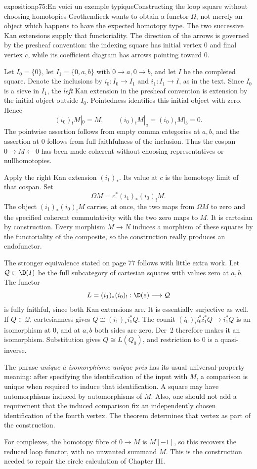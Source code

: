 \begin{dcomment}{exposition}{p75:En voici un exemple typique}{Constructing the loop square without choosing homotopies}
Grothendieck wants to obtain a functor \(\Omega\), not merely an object which happens to have the expected homotopy type. The two successive Kan extensions supply that functoriality. The direction of the arrows is governed by the presheaf convention: the indexing square has initial vertex \(0\) and final vertex \(c\), while its coefficient diagram has arrows pointing toward \(0\).

Let \(I_0=\{0\}\), let \(I_1=\{0,a,b\}\) with \(0\to a,0\to b\), and let \(I\) be the completed square. Denote the inclusions by \(i_0:I_0\to I_1\) and \(i_1:I_1\to I\), as in the text. Since \(I_0\) is a sieve in \(I_1\), the \emph{left} Kan extension in the presheaf convention is extension by the initial object outside \(I_0\). Pointedness identifies this initial object with zero. Hence
\[
 (i_0)_!M|_0=M,\qquad
 (i_0)_!M|_a=(i_0)_!M|_b=0.
\]
The pointwise assertion follows from empty comma categories at \(a,b\), and the assertion at \(0\) follows from full faithfulness of the inclusion. Thus the cospan \(0\to M\leftarrow0\) has been made coherent without choosing representatives or nullhomotopies.

Apply the right Kan extension \((i_1)_*\). Its value at \(c\) is the homotopy limit of that cospan. Set
\[
 \Omega M=c^*(i_1)_*(i_0)_!M.
\]
The object \((i_1)_*(i_0)_!M\) carries, at once, the two maps from \(\Omega M\) to zero and the specified coherent commutativity with the two zero maps to \(M\). It is cartesian by construction. Every morphism \(M\to N\) induces a morphism of these squares by the functoriality of the composite, so the construction really produces an endofunctor.

The stronger equivalence stated on page 77 follows with little extra work. Let \(\mathcal Q\subset\D(I)\) be the full subcategory of cartesian squares with values zero at \(a,b\). The functor
\[
 L=(i_1)_*(i_0)_!:\D(e)\longrightarrow\mathcal Q
\]
is fully faithful, since both Kan extensions are. It is essentially surjective as well. If \(Q\in\mathcal Q\), cartesianness gives \(Q\cong(i_1)_*i_1^*Q\). The counit
\((i_0)_!i_0^*i_1^*Q\to i_1^*Q\) is an isomorphism at \(0\), and at \(a,b\) both sides are zero. Der~2 therefore makes it an isomorphism. Substitution gives \(Q\cong L(Q_0)\), and restriction to \(0\) is a quasi-inverse.

The phrase \emph{unique à isomorphisme unique près} has its usual universal-property meaning: after specifying the identification of the input with \(M\), a comparison is unique when required to induce that identification. A square may have automorphisms induced by automorphisms of \(M\). Also, one should not add a requirement that the induced comparison fix an independently chosen identification of the fourth vertex. The theorem determines that vertex as part of the construction.

For complexes, the homotopy fibre of \(0\to M\) is \(M[-1]\), so this recovers the reduced loop functor, with no unwanted summand \(M\). This is the construction needed to repair the circle calculation of Chapter III.
\end{dcomment}

